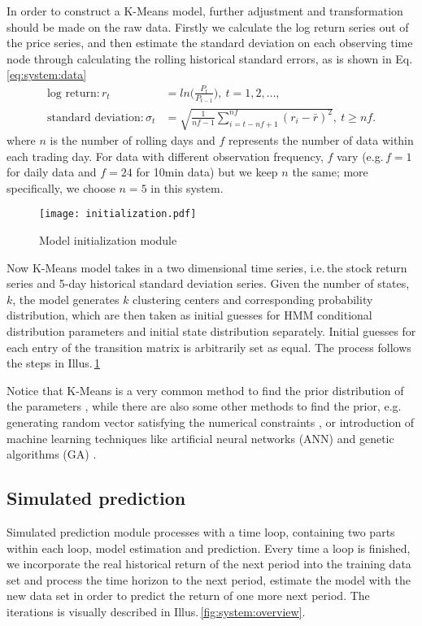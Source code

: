 In order to construct a K-Means model, 
further adjustment and transformation should be made on the raw data.
Firstly we calculate the log return series out of the price series,
and then estimate the standard deviation on each observing time node
through calculating the rolling historical standard errors,
as is shown in Eq.\,\ref{eq:system:data}
		\begin{equation}
		\label{eq:system:data}
		\begin{aligned}
		\text{log return}: r_t & = ln\big( \frac{P_{t}}{P_{t-1}} \big),\ t = 1,2,\dots, \\
		\text{standard deviation}: \sigma_t & = 
			\sqrt{\frac{1}{nf - 1}\sum_{i=t-nf+1}^{nf} (r_i - \bar{r})^2},\ t \geq nf.
		\end{aligned}
		\end{equation}
where $n$ is the number of rolling days and $f$ represents the number of data within each trading day.
For data with different observation frequency, 
$f$ vary (e.g.\,$f=1$ for daily data and $f=24$ for 10min data) but we keep $n$ the same;
more specifically, we choose $n=5$ in this system.

		\begin{figure}[!hbt]
        \center
        \texttt{[image: initialization.pdf]}
        \caption{Model initialization module}
        \label{fig:system:init}
        \end{figure}
Now K-Means model takes in a two dimensional time series,
i.e.\,the stock return series and 5-day historical standard deviation series.
Given the number of states, $k$, 
the model generates $k$ clustering centers and corresponding probability distribution,
which are then taken as initial guesses for HMM conditional distribution parameters 
and initial state distribution separately.
Initial guesses for each entry of the transition matrix is arbitrarily set as equal.
The process follows the steps in Illus.\,\ref{fig:system:init}

Notice that K-Means is a very common method to 
find the prior distribution of the parameters \cite{Brailovskiy:2014wu},
while there are also some other methods to find the prior,
e.g.\,generating random vector satisfying the numerical constraints \cite{Hassan:2005uw},
or introduction of machine learning techniques like artificial neural networks (ANN) 
and genetic algorithms (GA) \cite{Hassan:2007hk}. 


\subsection{Simulated prediction}
\label{sec:system:function:prediction}
Simulated prediction module processes with a time loop, 
containing two parts within each loop, model estimation and prediction.
Every time a loop is finished,
we incorporate the real historical return of the next period into the training data set
and process the time horizon to the next period,
estimate the model with the new data set in order to 
predict the return of one more next period.
The iterations is visually described in Illus.\,\ref{fig:system:overview}.


